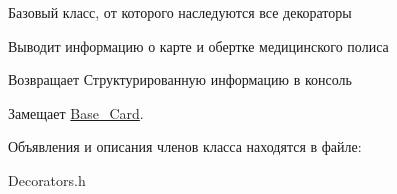 Базовый класс, от которого наследуются все декораторы 

Выводит информацию о карте и обертке медицинского полиса \begin{DoxyReturn}{Возвращает}
Структурированную информацию в консоль
\end{DoxyReturn}


Замещает \hyperlink{classBase__Card_a6fecba4a310841af77775165b4fc064c}{Base\+\_\+\+Card}.



Объявления и описания членов класса находятся в файле\+:\begin{DoxyCompactItemize}
\item 
Decorators.\+h\end{DoxyCompactItemize}
